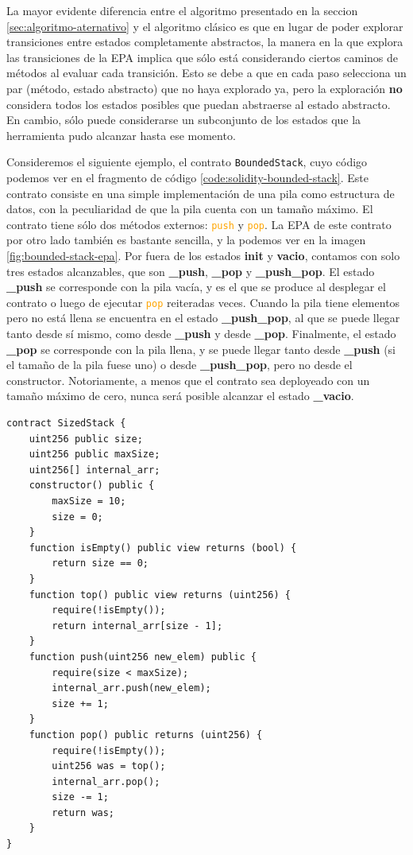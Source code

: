 La mayor evidente diferencia entre el algoritmo presentado en la seccion \ref{sec:algoritmo-aternativo} y el algoritmo clásico es que en lugar de poder explorar transiciones entre estados completamente abstractos, la manera en la que explora las transiciones de la EPA implica que sólo está considerando ciertos caminos de métodos al evaluar cada transición.
Esto se debe a que en cada paso selecciona un par (método, estado abstracto) que no haya explorado ya, pero la exploración \textbf{no} considera todos los estados posibles que puedan abstraerse al estado abstracto.
En cambio, sólo puede considerarse un subconjunto de los estados que la herramienta pudo alcanzar hasta ese momento.

Consideremos el siguiente ejemplo, el contrato \texttt{BoundedStack}, cuyo código podemos ver en el fragmento de código \ref{code:solidity-bounded-stack}.
Este contrato consiste en una simple implementación de una pila como estructura de datos, con la peculiaridad de que la pila cuenta con un tamaño máximo.
El contrato tiene sólo dos métodos externos: \textcolor{orange}{\texttt{push}} y \textcolor{orange}{\texttt{pop}}.
La EPA de este contrato por otro lado también es bastante sencilla, y la podemos ver en la imagen \ref{fig:bounded-stack-epa}.
Por fuera de los estados \textbf{init} y \textbf{vacio}, contamos con solo tres estados alcanzables, que son \textbf{\_push}, \textbf{\_pop} y \textbf{\_push\_pop}.
El estado \textbf{\_push} se corresponde con la pila vacía, y es el que se produce al desplegar el contrato o luego de ejecutar \textcolor{orange}{\texttt{pop}} reiteradas veces.
Cuando la pila tiene elementos pero no está llena se encuentra en el estado \textbf{\_push\_pop}, al que se puede llegar tanto desde sí mismo, como desde \textbf{\_push} y desde \textbf{\_pop}.
Finalmente, el estado \textbf{\_pop} se corresponde con la pila llena, y se puede llegar tanto desde \textbf{\_push} (si el tamaño de la pila fuese uno) o desde \textbf{\_push\_pop}, pero no desde el constructor.
Notoriamente, a menos que el contrato sea deployeado con un tamaño máximo de cero, nunca será posible alcanzar el estado \textbf{\_vacio}.

\begin{lstlisting}[language=Solidity, label={code:solidity-bounded-stack}, caption={Contrato Inteligente \texttt{BoundedStack} en Solidity},captionpos=b]
contract SizedStack {
    uint256 public size;
    uint256 public maxSize;
    uint256[] internal_arr;
    constructor() public {
        maxSize = 10;
        size = 0;
    }
    function isEmpty() public view returns (bool) {
        return size == 0;
    }
    function top() public view returns (uint256) {
        require(!isEmpty());
        return internal_arr[size - 1];
    }
    function push(uint256 new_elem) public {
        require(size < maxSize);
        internal_arr.push(new_elem);
        size += 1;
    }
    function pop() public returns (uint256) {
        require(!isEmpty());
        uint256 was = top();
        internal_arr.pop();
        size -= 1;
        return was;
    }
}
\end{lstlisting}


